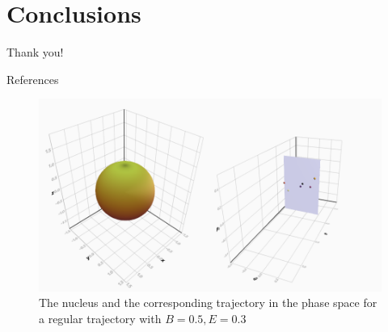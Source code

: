 \documentclass{beamer}
\begin{document}

% 		




\section{Conclusions}

\begin{frame}[standout]
Thank you!
\end{frame}


\begin{frame}[allowframebreaks]{References}


\end{frame}

\appendix


\begin{frame}
	\begin{figure}
		\includegraphics[width=\textwidth]{nucleus-with-poincare}
		\caption{The nucleus and the corresponding trajectory in the phase space
		for a regular trajectory with \(B=0.5, E=0.3\)}
	\end{figure}
\end{frame}
\end{document}

